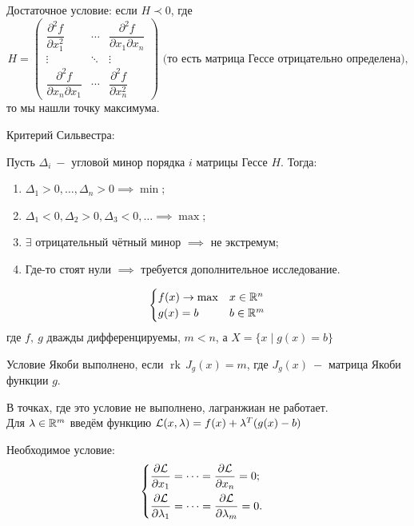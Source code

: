 \documentclass[a4paper,11pt]{article}
\begin{document}
Достаточное условие: если $H \prec 0$, где
\[H = \begin{pmatrix}
\dfrac{\partial^2 f}{\partial x_1^2} & \cdots & \dfrac{\partial^2 f}{\partial x_1 \partial x_n} \\[0.5cm]
\vdots & \ddots & \vdots \\[0.3cm]
\dfrac{\partial^2 f}{\partial x_n \partial x_1} & \cdots & \dfrac{\partial^2 f}{\partial x_n^2}
\end{pmatrix} \text{ (то есть матрица Гессе отрицательно определена),}\] 
то мы нашли точку максимума.



Критерий Сильвестра:

Пусть $\Delta_i\ -$ угловой минор порядка $i$ матрицы Гессе $H$. Тогда:
\begin{enumerate}
    \item $\Delta_1 > 0,\dots,  \Delta_n > 0 \implies \min$;
    \item $\Delta_1 < 0, \Delta_2 > 0, \Delta_3 < 0,\ldots \implies \max$;
    \item $\exists$ отрицательный чётный минор $\implies$ не экстремум;
    \item Где-то стоят нули $\implies$ требуется дополнительное исследование.
\end{enumerate}

\[\begin{cases}
    f(x) \to \max & x\in\mathbb{R}^n\\
    g(x) = b & b\in\mathbb{R}^m
\end{cases}\]
где $f,\ g$ дважды дифференцируемы, $m < n$, а $X = \{x\mid g(x) = b\}$

Условие Якоби выполнено, если $\operatorname{rk}\, J_g(x) = m$, где $J_g(x)\ -$ матрица Якоби функции $g$.

В точках, где это условие не выполнено, лагранжиан не работает.\\[5mm]

Для $\lambda \in\mathbb{R}^m$ введём функцию $\mathcal{L}(x,\lambda) = f(x) + \lambda^T(g(x) - b)$

Необходимое условие:
\[\begin{cases}
    \dfrac{\partial \mathcal{L}}{\partial x_1} = \cdots = \dfrac{\partial\mathcal{L}}{\partial x_n} = 0;\\[3mm]
    \dfrac{\partial \mathcal{L}}{\partial \lambda_1} = \cdots = \dfrac{\partial\mathcal{L}}{\partial \lambda_m} = 0.
\end{cases}\]
\end{document}
